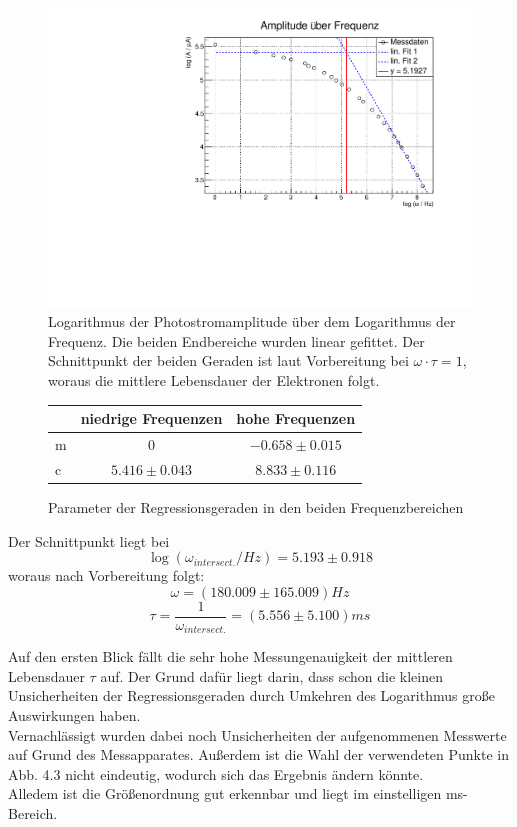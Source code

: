 \begin{figure}
\label{A4_reg}
\centering
\includegraphics[scale=0.5]{../A4/A4_2fits.pdf}
\caption{Logarithmus der Photostromamplitude über dem Logarithmus der Frequenz. Die beiden Endbereiche wurden linear gefittet. Der Schnittpunkt der beiden Geraden ist laut Vorbereitung bei $\omega \cdot \tau = 1$, woraus die mittlere Lebensdauer der Elektronen folgt.}
\end{figure}


\begin{figure}
\label{A4_param}
\caption{Parameter der Regressionsgeraden in den beiden Frequenzbereichen}
\vspace{0.4cm}
\begin{tabular}{lcc}
& niedrige Frequenzen & hohe Frequenzen \\ 
\hline
\hline
m & 0 & $-0.658 \pm 0.015$\\
c & $5.416 \pm 0.043$ & $8.833 \pm 0.116$ \\
\end{tabular}
\end{figure}

Der Schnittpunkt liegt bei 
$$\log(\omega _{intersect.} / Hz) = 5.193 \pm 0.918$$
woraus nach Vorbereitung folgt:
$$\omega = (180.009 \pm 165.009) Hz $$
$$\tau = \frac{1}{\omega _{intersect.}} = (5.556 \pm 5.100) ms$$

Auf den ersten Blick fällt die sehr hohe Messungenauigkeit der mittleren Lebensdauer $\tau$ auf. Der Grund dafür liegt darin, dass schon die kleinen Unsicherheiten der Regressionsgeraden durch Umkehren des Logarithmus große Auswirkungen haben. \\
Vernachlässigt wurden dabei noch Unsicherheiten der aufgenommenen Messwerte auf Grund des Messapparates. Außerdem ist die Wahl der verwendeten Punkte in Abb. 4.3 nicht eindeutig, wodurch sich das Ergebnis ändern könnte.\\
Alledem ist die Größenordnung gut erkennbar und liegt im einstelligen ms-Bereich.  

